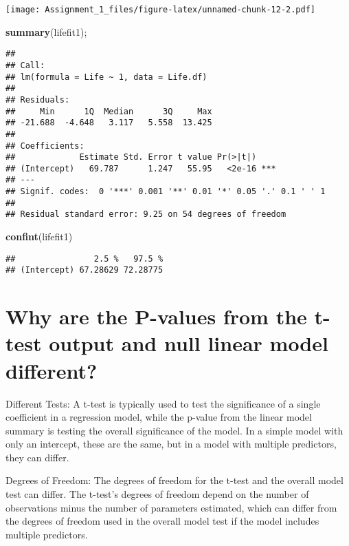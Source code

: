 \documentclass[
]{article}
\newenvironment{Shaded}{\begin{snugshade}}{\end{snugshade}}
\newcommand{\FunctionTok}[1]{\textcolor[rgb]{0.13,0.29,0.53}{\textbf{#1}}}
\newcommand{\NormalTok}[1]{#1}
\begin{document}
\texttt{[image: Assignment\_1\_files/figure-latex/unnamed-chunk-12-2.pdf]}

\begin{Shaded}
\begin{Highlighting}[]
\FunctionTok{summary}\NormalTok{(lifefit1);}
\end{Highlighting}
\end{Shaded}

\begin{verbatim}
## 
## Call:
## lm(formula = Life ~ 1, data = Life.df)
## 
## Residuals:
##     Min      1Q  Median      3Q     Max 
## -21.688  -4.648   3.117   5.558  13.425 
## 
## Coefficients:
##             Estimate Std. Error t value Pr(>|t|)    
## (Intercept)   69.787      1.247   55.95   <2e-16 ***
## ---
## Signif. codes:  0 '***' 0.001 '**' 0.01 '*' 0.05 '.' 0.1 ' ' 1
## 
## Residual standard error: 9.25 on 54 degrees of freedom
\end{verbatim}

\begin{Shaded}
\begin{Highlighting}[]
\FunctionTok{confint}\NormalTok{(lifefit1)}
\end{Highlighting}
\end{Shaded}

\begin{verbatim}
##                2.5 %   97.5 %
## (Intercept) 67.28629 72.28775
\end{verbatim}

\section{Why are the P-values from the t-test output and null linear
model
different?}\label{why-are-the-p-values-from-the-t-test-output-and-null-linear-model-different}

Different Tests: A t-test is typically used to test the significance of
a single coefficient in a regression model, while the p-value from the
linear model summary is testing the overall significance of the model.
In a simple model with only an intercept, these are the same, but in a
model with multiple predictors, they can differ.

Degrees of Freedom: The degrees of freedom for the t-test and the
overall model test can differ. The t-test's degrees of freedom depend on
the number of observations minus the number of parameters estimated,
which can differ from the degrees of freedom used in the overall model
test if the model includes multiple predictors.
\end{document}
